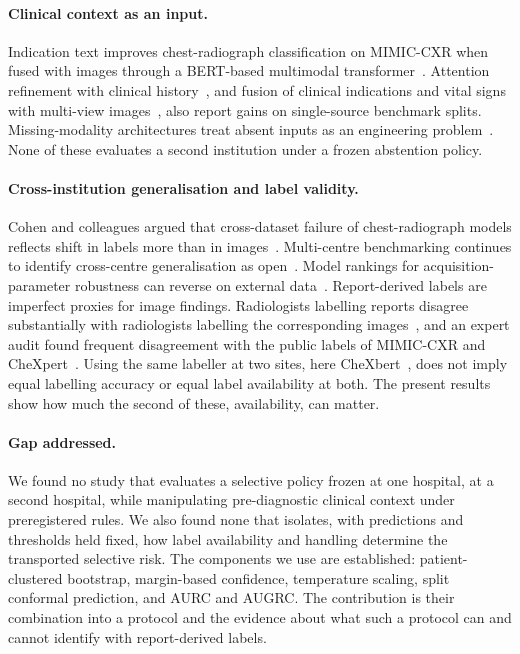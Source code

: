 \paragraph{Clinical context as an input.}
Indication text improves chest-radiograph classification on MIMIC-CXR when
fused with images through a BERT-based multimodal
transformer~\cite{jacenkow2022indication}. Attention refinement with clinical
history~\cite{yang2025mcxnet}, and fusion of clinical indications and vital
signs with multi-view images~\cite{sloan2025clinically}, also report gains on
single-source benchmark splits. Missing-modality architectures treat absent
inputs as an engineering problem~\cite{wang2025missing,wang2025moehealth}.
None of these evaluates a second institution under a frozen abstention policy.

\paragraph{Cross-institution generalisation and label validity.}
Cohen and colleagues argued that cross-dataset failure of chest-radiograph
models reflects shift in labels more than in images~\cite{cohen2020limits}.
Multi-centre benchmarking continues to identify cross-centre generalisation as
open~\cite{cxrlt2026}. Model rankings for acquisition-parameter robustness can
reverse on external data~\cite{farquhar2026acquisition}. Report-derived labels
are imperfect proxies for image findings. Radiologists labelling reports
disagree substantially with radiologists labelling the corresponding
images~\cite{jain2021visualchexbert}, and an expert audit found frequent
disagreement with the public labels of MIMIC-CXR and
CheXpert~\cite{rafferty2025limitations}. Using the same labeller at two sites,
here CheXbert~\cite{smit2020chexbert}, does not imply equal labelling accuracy
or equal label availability at both. The present results show how much the
second of these, availability, can matter.

\paragraph{Gap addressed.}
We found no study that evaluates a selective policy frozen at one hospital, at
a second hospital, while manipulating pre-diagnostic clinical context under
preregistered rules. We also found none that isolates, with predictions and
thresholds held fixed, how label availability and handling determine the
transported selective risk. The components we use are established: patient-clustered
bootstrap, margin-based confidence, temperature scaling, split conformal
prediction, and AURC and AUGRC. The contribution is their combination into a
protocol and the evidence about what such a protocol can and cannot identify
with report-derived labels.
